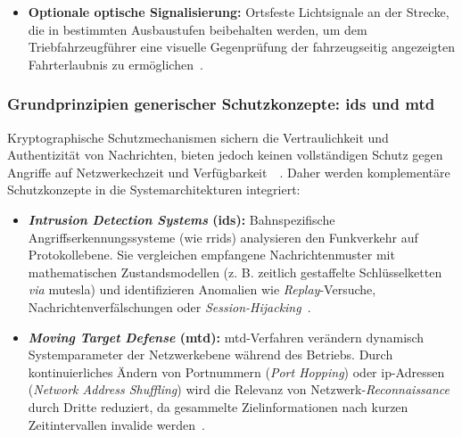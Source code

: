 \documentclass[runningheads]{res/llncs}
\begin{document}
\begin{itemize}
    \item \textbf{Optionale optische Signalisierung:} Ortsfeste Lichtsignale an der Strecke, die in bestimmten Ausbaustufen beibehalten werden, um dem Triebfahrzeugführer eine visuelle Gegenprüfung der fahrzeugseitig angezeigten Fahrterlaubnis zu ermöglichen~\parencite[S. 10]{xiangliuCyber2020}.
\end{itemize}


\subsubsection{\texorpdfstring{Grundprinzipien generischer Schutzkonzepte: \gls{ids} und \gls{mtd}}{Grundprinzipien generischer Schutzkonzepte: IDS und MTD}}
\label{sec:Grundprinzipien_generischer_Schutzkonzepte_IDS_und_MTD}
Kryptographische Schutzmechanismen sichern die Vertraulichkeit und Authentizität von Nachrichten, bieten jedoch keinen vollständigen Schutz gegen Angriffe auf Netzwerkechzeit und Verfügbarkeit~\parencite[S. 121]{poschingerOpenMTD2020}~\parencite[S. 60]{melaragnoRail2016}. Daher werden komplementäre Schutzkonzepte in die Systemarchitekturen integriert:

\begin{itemize}
    \item \textbf{\textit{Intrusion Detection Systems} (\gls{ids}):} Bahnspezifische Angriffserkennungssysteme (wie \gls{rrids}) analysieren den Funkverkehr auf Protokollebene. Sie vergleichen empfangene Nachrichtenmuster mit mathematischen Zustandsmodellen (z. B. zeitlich gestaffelte Schlüsselketten \textit{via} \gls{mutesla}) und identifizieren Anomalien wie \textit{Replay}-Versuche, Nachrichtenverfälschungen oder \textit{Session-Hijacking}~\parencite[S. 60--63]{melaragnoRail2016}.
    \item \textbf{\textit{Moving Target Defense} (\gls{mtd}):} \gls{mtd}-Verfahren verändern dynamisch Systemparameter der Netzwerkebene während des Betriebs. Durch kontinuierliches Ändern von Portnummern (\textit{Port Hopping}) oder \gls{ip}-Adressen (\textit{Network Address Shuffling}) wird die Relevanz von Netzwerk-\textit{Reconnaissance} durch Dritte reduziert, da gesammelte Zielinformationen nach kurzen Zeitintervallen invalide werden~\parencite[S. 66, 121]{poschingerOpenMTD2020}.
\end{itemize}
\end{document}
